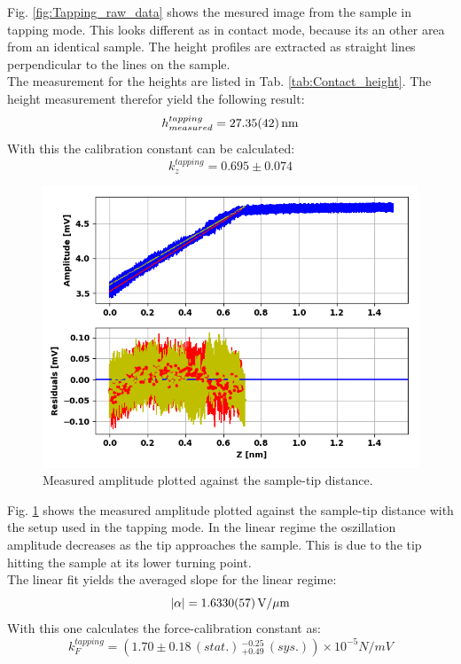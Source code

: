 \documentclass[%
 reprint,
amsmath,amssymb,
pra,
]{revtex4-1}
\begin{document}
Fig. \ref{fig:Tapping_raw_data} shows the mesured image from the sample in tapping mode. This looks different as in contact mode, because its an other area from an identical sample. The height profiles are extracted as straight lines perpendicular to the lines on the sample. \\
The measurement for the heights are listed in Tab. \ref{tab:Contact_height}. The height measurement therefor yield the following result:
\begin{equation*}
h_{measured}^{tapping} = \SI{27.35 \pm 0.42}{nm}
\end{equation*}
With this the calibration constant can be calculated:
\begin{equation*}
k_z^{tapping} = 0.695 \pm 0.074
\end{equation*}

\begin{figure}
\centering
\includegraphics[scale=0.5]{Bilder/Tapping_Mode/Snap_in_curve_fit.PNG}
\caption{Measured amplitude plotted against the sample-tip distance.}
\label{fig:Tapping_snap_in}
\end{figure}

Fig. \ref{fig:Tapping_snap_in} shows the measured amplitude plotted against the sample-tip distance with the setup used in the tapping mode. In the linear regime the oszillation amplitude decreases as the tip approaches the sample. This is due to the tip hitting the sample at its lower turning point. \\
The linear fit yields the averaged slope for the linear regime:
\begin{equation*} 
|\alpha| = \SI{1.6330 \pm 0.0057}{V \per \mu m}
\end{equation*}
With this one calculates the force-calibration constant as:
\begin{equation*}
k_F^{tapping} = (1.70 \pm 0.18 \, (stat.) \, _{+ 0.49} ^{- 0.25} \, (sys.)) \times 10^{-5} \si{N \per mV}
\end{equation*} 
\end{document}
